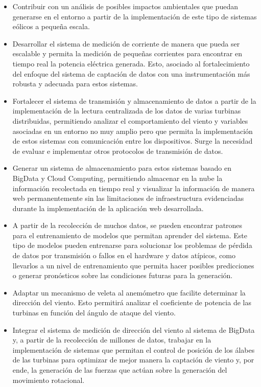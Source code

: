 \documentclass[letterpaper,12pt, oneside]{book}
\begin{document}
\begin{itemize}
\item Contribuir con un análisis de posibles impactos ambientales que puedan generarse en el entorno a partir de la implementación de este tipo de sistemas eólicos a pequeña escala.

\item Desarrollar el sistema de medición de corriente de manera que pueda ser escalable y permita la medición de pequeñas corrientes para encontrar en tiempo real la potencia eléctrica generada. Esto, asociado al fortalecimiento del enfoque del sistema de captación de datos con una instrumentación más robusta y adecuada para estos sistemas.

\item Fortalecer el sistema de transmisión y almacenamiento de datos a partir de la implementación de la lectura centralizada de los datos de varias turbinas distribuidas, permitiendo analizar el comportamiento del viento y variables asociadas en un entorno no muy amplio pero que permita la implementación de estos sistemas con comunicación entre los dispositivos. Surge la necesidad de evaluar e implementar otros protocolos de transmisión de datos.

\item Generar un sistema de almacenamiento para estos sistemas basado en BigData y Cloud Computing, permitiendo almacenar en la nube la información recolectada en tiempo real y visualizar la información de manera web permanentemente sin las limitaciones de infraestructura evidenciadas durante la implementación de la aplicación web desarrollada.

\item A partir de la recolección de muchos datos, se pueden encontrar patrones para el entrenamiento de modelos que permitan aprender del sistema. Este tipo de modelos pueden entrenarse para solucionar los problemas de pérdida de datos por transmisión o fallos en el hardware y datos atípicos, como llevarlos a un nivel de entrenamiento que permita hacer posibles predicciones o generar pronósticos sobre las condiciones futuras para la generación.

\item Adaptar un mecanismo de veleta al anemómetro que facilite determinar la dirección del viento. Esto permitirá analizar el coeficiente de potencia de las turbinas en función del ángulo de ataque del viento.

\item Integrar el sistema de medición de dirección del viento al sistema de BigData y, a partir de la recolección de millones de datos, trabajar en la implementación de sistemas que permitan el control de posición de los álabes de las turbinas para optimizar de mejor manera la captación de viento y, por ende, la generación de las fuerzas que actúan sobre la generación del movimiento rotacional.

\end{itemize}

%



\end{document}

